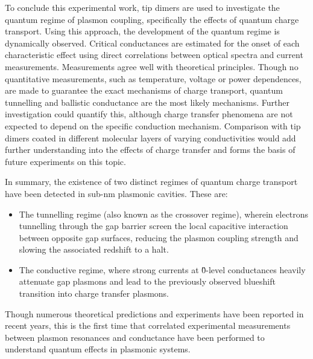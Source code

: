\documentclass[12pt, a4paper, twoside]{book}
\begin{document}
To conclude this experimental work, tip dimers are used to investigate the quantum regime of plasmon coupling, specifically the effects of quantum charge transport. Using this approach, the development of the quantum regime is dynamically observed. Critical conductances are estimated for the onset of each characteristic effect using direct correlations between optical spectra and current measurements. Measurements agree well with theoretical principles. Though no quantitative measurements, such as temperature, voltage or power dependences, are made to guarantee the exact mechanisms of charge transport, quantum tunnelling and ballistic conductance are the most likely mechanisms. Further investigation could quantify this, although charge transfer phenomena are not expected to depend on the specific conduction mechanism. Comparison with tip dimers coated in different molecular layers of varying conductivities would add further understanding into the effects of charge transfer and forms the basis of future experiments on this topic.

In summary, the existence of two distinct regimes of quantum charge transport have been detected in sub-nm plasmonic cavities. These are:
\begin{itemize}
\item The tunnelling regime (also known as the crossover regime), wherein electrons tunnelling through the gap barrier screen the local capacitive interaction between opposite gap surfaces, reducing the plasmon coupling strength and slowing the associated redshift to a halt.
\item The conductive regime, where strong currents at \G0-level conductances heavily attenuate gap plasmons and lead to the previously observed blueshift transition into charge transfer plasmons.
\end{itemize}
Though numerous theoretical predictions and experiments have been reported in recent years, this is the first time that correlated experimental measurements between plasmon resonances and conductance have been performed to understand quantum effects in plasmonic systems.

\ifstandalone
\begin{singlespace}
\fontsize{8pt}{1em}\selectfont
\printbibliography[notcategory=fullcited]
\end{singlespace}
\fi
\end{document}
